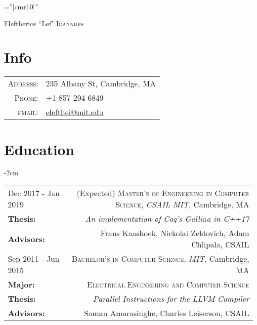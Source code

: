 \documentclass[lettersize,10pt]{article}
\begin{document}
\pagestyle{empty} %
\font\fb=''[cmr10]'' %

\par{\centering
		{\Huge Eleftherios ``Lef" \textsc{Ioannidis}
	}
	\bigskip\par}

\section{Info}

\begin{tabularx}{\textwidth}{rl}
    \textsc{Address:}   & 235 Albany St, Cambridge, MA \\
    \textsc{Phone:}     & +1 857 294 6849\\
    \textsc{email:}     & \href{mailto:elefthei@mit.edu}{elefthei@mit.edu}
\end{tabularx}

\section{Education}
\begin{adjustwidth}{}{-2cm}
  \begin{tabularx}{\textwidth}{L R}
	Dec 2017 - Jan 2019 & (Expected) \textsc{Master's of Engineering in Computer Science}, \emph{CSAIL MIT}, Cambridge, MA\\
    \textbf{Thesis:}    & \emph{An implementation of Coq's Gallina in C++17} \\
	\textbf{Advisors:}  & Frans Kaashoek, Nickolai Zeldovich, Adam Chlipala, CSAIL \\

	Sep 2011 - Jun 2015 & \textsc{Bachelor's in Computer Science}, \emph{MIT}, Cambridge, MA\\
	\textbf{Major:}     & \textsc{Electrical Engineering and Computer Science} \\
	\textbf{Thesis:}    & \emph{Parallel Instructions for the LLVM Compiler} \\
	\textbf{Advisors:}   & Saman Amarasinghe, Charles Leiserson, CSAIL \\
  \end{tabularx}
\end{adjustwidth}

\end{document}

